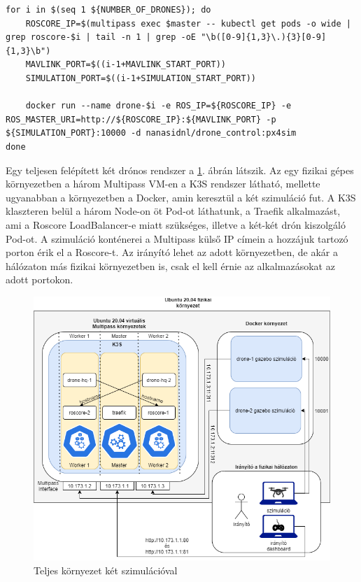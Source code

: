 \begin{lstlisting}[caption={Drónok indítása külső Docker környezetben}, label={lst:dronedeploy}]
for i in $(seq 1 ${NUMBER_OF_DRONES}); do
	ROSCORE_IP=$(multipass exec $master -- kubectl get pods -o wide | grep roscore-$i | tail -n 1 | grep -oE "\b([0-9]{1,3}\.){3}[0-9]{1,3}\b")
	MAVLINK_PORT=$((i-1+MAVLINK_START_PORT))
	SIMULATION_PORT=$((i-1+SIMULATION_START_PORT))

	docker run --name drone-$i -e ROS_IP=${ROSCORE_IP} -e ROS_MASTER_URI=http://${ROSCORE_IP}:${MAVLINK_PORT} -p ${SIMULATION_PORT}:10000 -d nanasidnl/drone_control:px4sim
done
\end{lstlisting}

\noindent
Egy teljesen felépített két drónos rendszer a \ref{fig:full2drone}. ábrán látszik. Az egy fizikai gépes környezetben a három Multipass VM-en a K3S rendszer látható, mellette ugyanabban a környezetben a Docker, amin keresztül a két szimuláció fut. A K3S klaszteren belül a három Node-on öt Pod-ot láthatunk, a Traefik alkalmazást, ami a Roscore LoadBalancer-e miatt szükséges, illetve a két-két drón kiszolgáló Pod-ot. A szimuláció konténerei a Multipass külső IP címein a hozzájuk tartozó porton érik el a Roscore-t. Az irányító lehet az adott környezetben, de akár a hálózaton más fizikai környezetben is, csak el kell érnie az alkalmazásokat az adott portokon.

\begin{figure}
	\centering
	\includegraphics[width=\linewidth]{figures/full2drone.png}
	\caption{Teljes környezet két szimulációval}
	\label{fig:full2drone}
\end{figure}